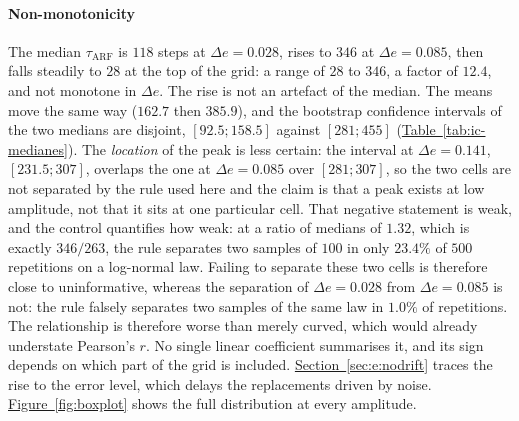 \documentclass[10pt,conference]{IEEEtran}
\theoremstyle{definition}
\begin{document}
\paragraph{Non-monotonicity} The median $\tau_{\mathrm{ARF}}$ is $118$ steps at
$\Delta e = 0.028$, rises to $346$ at $\Delta e = 0.085$, then falls steadily to $28$ at
the top of the grid: a range of $28$ to $346$, a factor of $12.4$, and not monotone in
$\Delta e$. The rise is not an artefact of the median. The means move the same way
($162.7$ then $385.9$), and the bootstrap confidence intervals of the two medians are
disjoint, $[92.5 ; 158.5]$ against $[281 ; 455]$ (\hyperref[tab:ic-medianes]{Table~\ref*{tab:ic-medianes}}). The
\emph{location} of the peak is less certain: the interval at $\Delta e = 0.141$,
$[231.5 ; 307]$, overlaps the one at $\Delta e = 0.085$ over $[281 ; 307]$, so the two
cells are not separated by the rule used here and the claim is that a peak exists at low
amplitude, not that it sits at one particular cell. That negative statement is weak, and
the control quantifies how weak: at a ratio of medians of $1.32$, which is exactly
$346/263$, the rule separates two samples of $100$ in only $23.4\%$ of $500$ repetitions
on a log-normal law. Failing to separate these two cells is therefore close to
uninformative, whereas the separation of $\Delta e = 0.028$ from $\Delta e = 0.085$ is
not: the rule falsely separates two samples of the same law in $1.0\%$ of repetitions.
The relationship is therefore worse than merely curved, which would already understate
Pearson's $r$. No single linear coefficient summarises it, and its sign depends on which
part of the grid is included. \hyperref[sec:e:nodrift]{Section~\ref*{sec:e:nodrift}} traces the rise to the error level,
which delays the replacements driven by noise. \hyperref[fig:boxplot]{Figure~\ref*{fig:boxplot}} shows the full
distribution at every amplitude.
\end{document}

